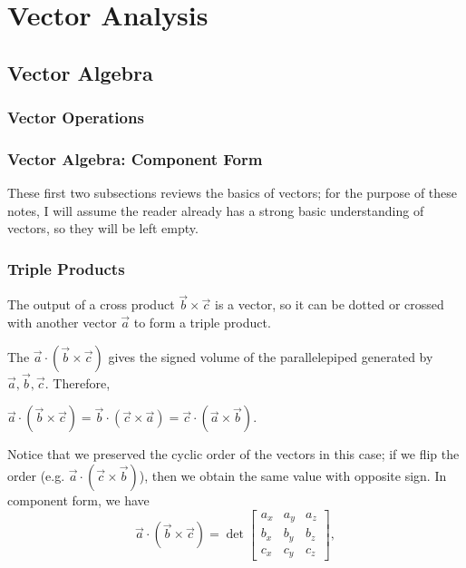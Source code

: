 \chapter{Vector Analysis}

\section{Vector Algebra}

\subsection{Vector Operations}

\subsection{Vector Algebra: Component Form}

These first two subsections reviews the basics of vectors; for the purpose of these notes, I will assume the reader already has a strong basic understanding of vectors, so they will be left empty.

\subsection{Triple Products}

The output of a cross product $\vec{b}\times\vec{c}$ is a vector, so it can be dotted or crossed with another vector $\vec{a}$ to form a triple product.

The  $\vec{a}\cdot(\vec{b}\times\vec{c})$ gives the signed volume of the parallelepiped generated by $\vec{a},\vec{b},\vec{c}$. Therefore,
\begin{claim}
$\vec{a}\cdot(\vec{b}\times\vec{c})=\vec{b}\cdot(\vec{c}\times\vec{a})=\vec{c}\cdot(\vec{a}\times\vec{b})$.
\end{claim}
Notice that we preserved the cyclic order of the vectors in this case; if we flip the order (e.g. $\vec{a}\cdot(\vec{c}\times\vec{b})$), then we obtain the same value with opposite sign. In component form, we have
\[\vec{a}\cdot(\vec{b}\times\vec{c})=\det\begin{bmatrix}
a_x & a_y & a_z\\
b_x & b_y & b_z\\
c_x & c_y & c_z
\end{bmatrix},\]

